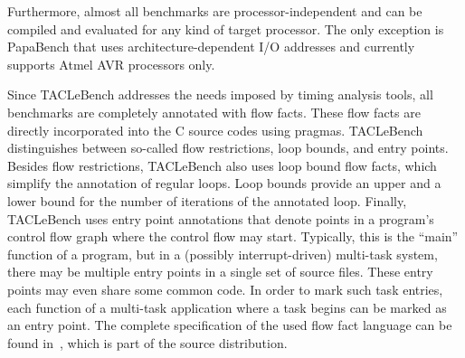 \documentclass[a4paper,UKenglish]{oasics-v2016}
\newcommand{\code}[1]{{\small{\texttt{#1}}}}
\begin{document}
Furthermore, almost all benchmarks are processor-independent and can
be compiled and evaluated for any kind of target processor.
The only exception is PapaBench that uses architecture-dependent
I/O addresses and currently supports Atmel AVR processors only.

Since TACLeBench addresses the needs imposed by timing analysis tools,
all benchmarks are completely annotated with flow facts.
These flow facts are directly incorporated into the C source codes using
pragmas. %
TACLeBench distinguishes between so-called flow restrictions, loop bounds, and entry points.
Besides flow restrictions, TACLeBench also uses loop bound flow facts, which simplify the annotation of regular loops.
Loop bounds provide an upper and a lower bound for the number of iterations of the annotated loop.
%
Finally, TACLeBench uses entry point annotations that denote points in a program's control flow graph where the control flow may start.
Typically, this is the ``main'' function of a program, but in a (possibly interrupt-driven) multi-task system, there may be multiple entry points in a single set of source files.
These entry points may even share some common code.
In order to mark such task entries, each function of a multi-task application where a task begins can be marked as an entry point.
%
%
%
%
The complete specification of the used flow fact language can be found in~\cite{flowfacts},
which is part of the source distribution.
\end{document}
